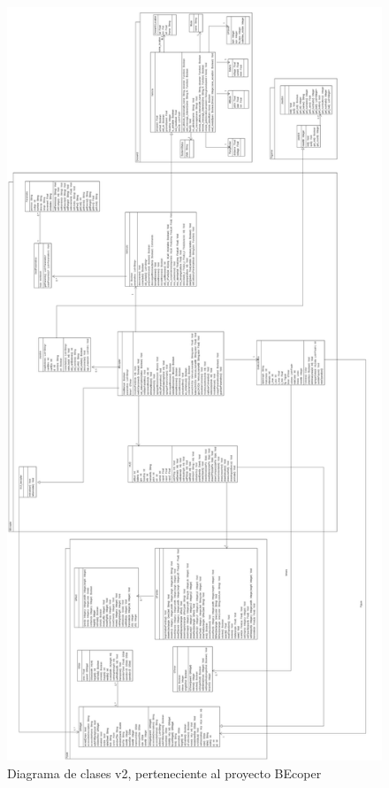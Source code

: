 \begin{figure}[h!]
	\centering
	\includegraphics[width=\linewidth, height=0.93\textheight]{Imagenes/DC_BEcopter}
	\caption{Diagrama de clases v2, perteneciente al proyecto BEcoper}
	\label{fig:dcbecopter}
\end{figure}

